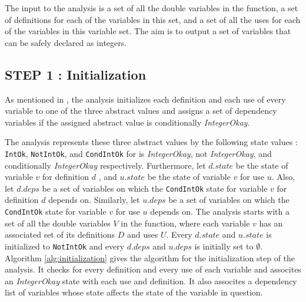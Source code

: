 The input to the analysis is a set of all the double variables in the function,
a set of definitions for each of the variables in this set, and a set of all
the uses for each of the variables in this variable set. The aim is to output a
set of variables that can be safely declared as integers.
%

\subsection{STEP 1 : Initialization}

As mentioned in , the analysis initializes each
definition and each use of every variable to one of the three abstract values
and assigns a set of dependency variables if the assigned abstract value is
conditionally \emph{IntegerOkay}. 

The analysis represents these three abstract values by the following state
values : \texttt{IntOk}, \texttt{NotIntOk}, and \texttt{CondIntOk} for is
\emph{IntegerOkay}, not \emph{IntegerOkay}, and conditionally \emph{IntegerOkay}
respectively.  Furthermore, let $d.state$ be the state of variable $v$ for
definition $d$ , and $u.state$ be the state of variable $v$ for use $u$. Also,
let $d.deps$ be a set of variables on which the \texttt{CondIntOk} state for
variable $v$ for definition $d$ depends on.  Similarly, let $u.deps$ be a set of
variables on which the \texttt{CondIntOk} state for variable $v$ for use $u$
depends on. The analysis starts with a set of all the double variables $V$ in
the \matlab function, where each variable $v$ has an associated set of its
definitions $D$ and uses $U$. Every $d.state$ and $u.state$ is initialized to
\texttt{NotIntOk} and every $d.deps$ and $u.deps$ is initially set to
$\emptyset$. Algorithm \ref{alg:initialization} gives the algorithm for the
initialization step of the analysis. It checks for every definition and every
use of each variable and assocites an \emph{IntegerOkay} state with each use and
definition. It also assocites a dependency list of variables whose state affects
the state of the variable in question.

